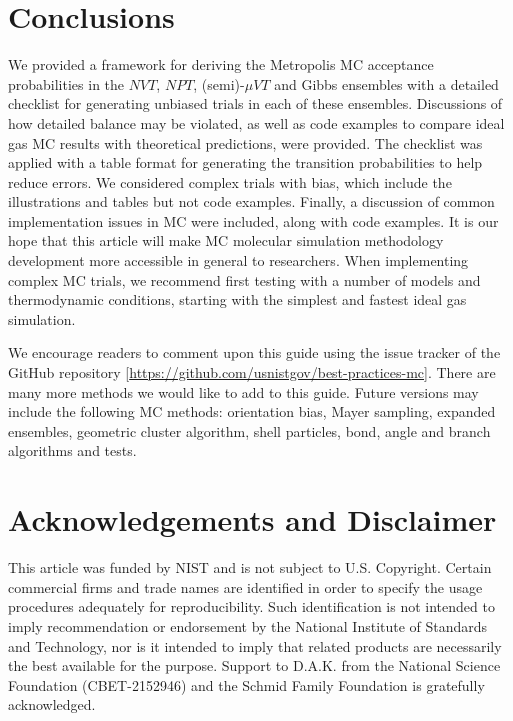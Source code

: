 \section{\label{sec:conc}Conclusions}

We provided a framework for deriving the Metropolis MC acceptance probabilities in the $NVT$, $NPT$, (semi)-$\mu VT$ and Gibbs ensembles with a detailed checklist for generating unbiased trials in each of these ensembles.
Discussions of how detailed balance may be violated, as well as code examples to compare ideal gas MC results with theoretical predictions, were provided.
The checklist was applied with a table format for generating the transition probabilities to help reduce errors.
We considered complex trials with bias, which include the illustrations and tables but not code examples.
Finally, a discussion of common implementation issues in MC were included, along with code examples.
It is our hope that this article will make MC molecular simulation methodology development more accessible in general to researchers.
When implementing complex MC trials, we recommend first testing with a number of models and thermodynamic conditions, starting with the simplest and fastest ideal gas simulation.

We encourage readers to comment upon this guide using the issue tracker of the GitHub repository [\url{https://github.com/usnistgov/best-practices-mc}].
There are many more methods we would like to add to this guide.
Future versions may include the following MC methods: orientation bias, Mayer sampling, expanded ensembles, geometric cluster algorithm, shell particles, bond, angle and branch algorithms and tests.

\section{\label{sec:ack}Acknowledgements and Disclaimer}

This article was funded by NIST and is not subject to U.S. Copyright.
Certain commercial firms and trade names are identified in order to specify the usage procedures adequately for reproducibility.
Such identification is not intended to imply recommendation or endorsement by the National Institute of Standards and Technology, nor is it intended to imply that related products are necessarily the best available for the purpose.
Support to D.A.K. from the National Science Foundation (CBET-2152946) and the Schmid Family Foundation is gratefully acknowledged.
